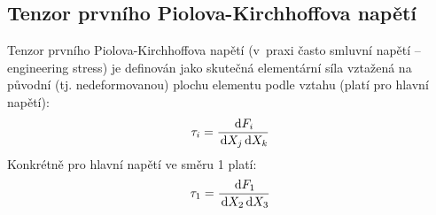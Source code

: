 
\subsection{Tenzor prvního Piolova-Kirchhoffova napětí}
Tenzor prvního Piolova-Kirchhoffova napětí (v~praxi často smluvní napětí -- engineering stress) je definován jako skutečná elementární síla vztažená na původní (tj. nedeformovanou) plochu elementu podle vztahu (platí pro hlavní napětí):
\begin{equation}
	\tau_i = \frac{\,\mathrm{d} F_i}{\,\mathrm{d} X_j \,\mathrm{d} X_k}
\end{equation}
Konkrétně pro hlavní napětí ve směru 1 platí:
\begin{equation}
	\tau_1 = \frac{\,\mathrm{d} F_1}{\,\mathrm{d} X_2 \,\mathrm{d} X_3}
\end{equation}
